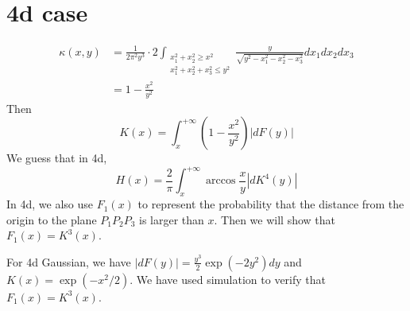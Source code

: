 \documentclass{article}
\begin{document}
\section{4d case}
\begin{align}
    \kappa(x,y) &=\frac{1}{2\pi^2 y^3} 
    \cdot 2\int_{\substack{x_1^2+x_2^2\geq x^2\\
    x_1^2+x_2^2+x_3^2\leq y^2 }} 
    \frac{y}{\sqrt{y^2-x_1^2-x_2^2-x_3^2}} dx_1 dx_2 dx_3\\
&=    1-\frac{x^2}{y^2}
\end{align}
Then
\begin{equation}
    K(x) = \int_x^{+\infty}
    (1-\frac{x^2}{y^2}) |dF(y)|
\end{equation}
We guess that in 4d,
\begin{equation}
    H(x) = \frac{2}{\pi}
    \int_x^{+\infty} \arccos\frac{x}{y}
    |d K^4(y)|
\end{equation}
In 4d, we also use $F_1(x)$ to represent the probability that
the distance from the origin to the plane $P_1P_2P_3$
is larger than $x$. Then we will show that $F_1(x)=K^3(x)$.

For 4d Gaussian, we have $|dF(y)| =
\frac{y^3}{2}\exp(-2y^2)dy$ and $K(x) = \exp(-x^2/2)$.
We have used simulation to verify that $F_1(x) = K^3(x)$.
\end{document}
